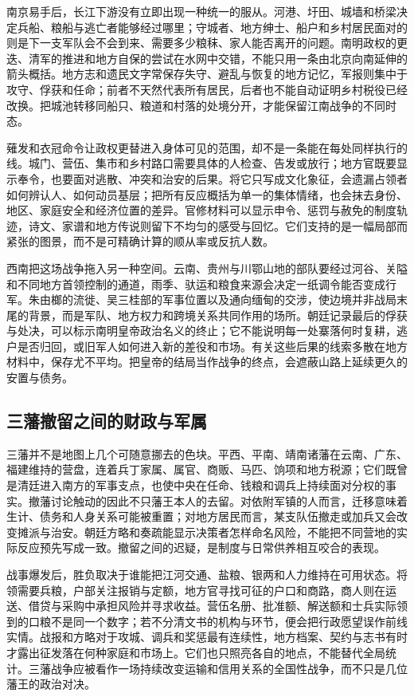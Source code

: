 南京易手后，长江下游没有立即出现一种统一的服从。河港、圩田、城墙和桥梁决定兵船、粮船与逃亡者能够经过哪里；守城者、地方绅士、船户和乡村居民面对的则是下一支军队会不会到来、需要多少粮秣、家人能否离开的问题。南明政权的更迭、清军的推进和地方自保的尝试在水网中交错，不能只用一条由北京向南延伸的箭头概括。地方志和遗民文字常保存失守、避乱与恢复的地方记忆，军报则集中于攻守、俘获和任命；前者不天然代表所有居民，后者也不能自动证明乡村税役已经改换。把城池转移同船只、粮道和村落的处境分开，才能保留江南战争的不同时态。

薙发和衣冠命令让政权更替进入身体可见的范围，却不是一条能在每处同样执行的线。城门、营伍、集市和乡村路口需要具体的人检查、告发或放行；地方官既要显示奉令，也要面对逃散、冲突和治安的后果。将它只写成文化象征，会遗漏占领者如何辨认人、如何动员基层；把所有反应概括为单一的集体情绪，也会抹去身份、地区、家庭安全和经济位置的差异。官修材料可以显示申令、惩罚与赦免的制度轨迹，诗文、家谱和地方传说则留下不均匀的感受与回忆。它们支持的是一幅局部而紧张的图景，而不是可精确计算的顺从率或反抗人数。

西南把这场战争拖入另一种空间。云南、贵州与川鄂山地的部队要经过河谷、关隘和不同地方首领控制的通道，雨季、驮运和粮食来源会决定一纸调令能否变成行军。朱由榔的流徙、吴三桂部的军事位置以及通向缅甸的交涉，使边境并非战局末尾的背景，而是军队、地方权力和跨境关系共同作用的场所。朝廷记录最后的俘获与处决，可以标示南明皇帝政治名义的终止；它不能说明每一处寨落何时复耕，逃户是否归回，或旧军人如何进入新的差役和市场。有关这些后果的线索多散在地方材料中，保存尤不平均。把皇帝的结局当作战争的终点，会遮蔽山路上延续更久的安置与债务。

\subsection*{三藩撤留之间的财政与军属}

三藩并不是地图上几个可随意挪去的色块。平西、平南、靖南诸藩在云南、广东、福建维持的营盘，连着兵丁家属、属官、商贩、马匹、饷项和地方税源；它们既曾是清廷进入南方的军事支点，也使中央在任命、钱粮和调兵上持续面对分权的事实。撤藩讨论触动的因此不只藩王本人的去留。对依附军镇的人而言，迁移意味着生计、债务和人身关系可能被重置；对地方居民而言，某支队伍撤走或加兵又会改变摊派与治安。朝廷方略和奏疏能显示决策者怎样命名风险，不能把不同营地的实际反应预先写成一致。撤留之间的迟疑，是制度与日常供养相互咬合的表现。

战事爆发后，胜负取决于谁能把江河交通、盐粮、银两和人力维持在可用状态。将领需要兵粮，户部关注报销与定额，地方官寻找可征的户口和商路，商人则在运送、借贷与采购中承担风险并寻求收益。营伍名册、批准额、解送额和士兵实际领到的口粮不是同一个数字；若不分清文书的机构与环节，便会把行政愿望误作前线实情。战报和方略对于攻城、调兵和奖惩最有连续性，地方档案、契约与志书有时才露出征发落在何种家庭和市场上。它们也只照亮各自的地点，不能替代全局统计。三藩战争应被看作一场持续改变运输和信用关系的全国性战争，而不只是几位藩王的政治对决。

